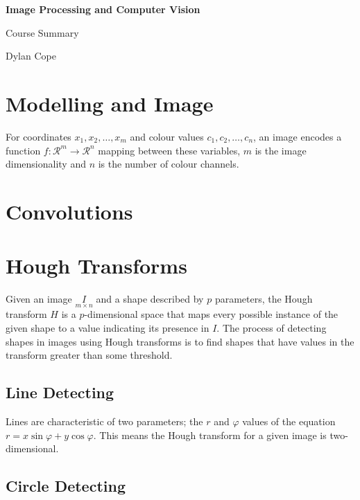 \documentclass[10pt, a4paper]{article}
\begin{document}
	\begin{center}
	{\Large\bf Image Processing and Computer Vision}

	\vspace{.1in}

	Course Summary

  Dylan Cope

	\vspace{.2in}

	\end{center}

	\section{Modelling and Image}

    For coordinates $x_1, x_2, \dots, x_m$ and colour values $c_1, c_2, \dots, c_n$, an image encodes a function $f : \mathcal{R}^m \rightarrow \mathcal{R}^n$ mapping between these variables, $m$ is the image dimensionality and $n$ is the number of colour channels.

  \section{Convolutions}

  \section{Hough Transforms}

  Given an image $\underset{m \times n}{I}$ and a shape described by $p$ parameters, the Hough transform $H$ is a $p$-dimensional space that maps every possible instance of the given shape to a value indicating its presence in $I$. The process of detecting shapes in images using Hough transforms is to find shapes that have values in the transform greater than some threshold.
  

  \subsection{Line Detecting}

  Lines are characteristic of two parameters; the $r$ and $\varphi$ values of the equation $r = x\sin \varphi + y\cos \varphi$. This means the Hough transform for a given image is two-dimensional.

  \subsection{Circle Detecting}
\end{document}
